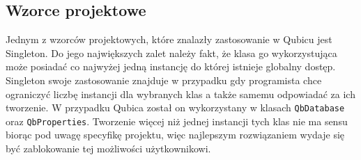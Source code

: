 \documentclass[12pt]{report}
\begin{document}
\newpage
\noindent
\begin{minipage}{\linewidth}
\label{diagram}
\end{minipage}

\subsection{Wzorce projektowe}

Jednym z wzorców projektowych, które znalazły zastosowanie w Qubicu jest Singleton. Do jego największych zalet należy fakt, że klasa go wykorzystująca może posiadać 
co najwyżej jedną instancję do której istnieje globalny dostęp. Singleton swoje zastosowanie znajduje w przypadku gdy programista chce ograniczyć liczbę instancji dla 
wybranych klas a także samemu odpowiadać za ich tworzenie. W przypadku Qubica został on wykorzystany w klasach {\tt QbDatabase} oraz {\tt QbProperties}. Tworzenie 
więcej niż jednej instancji tych klas nie ma sensu biorąc pod uwagę specyfikę projektu, więc najlepszym rozwiązaniem wydaje się być zablokowanie tej możliwości użytkownikowi. 
\end{document}
